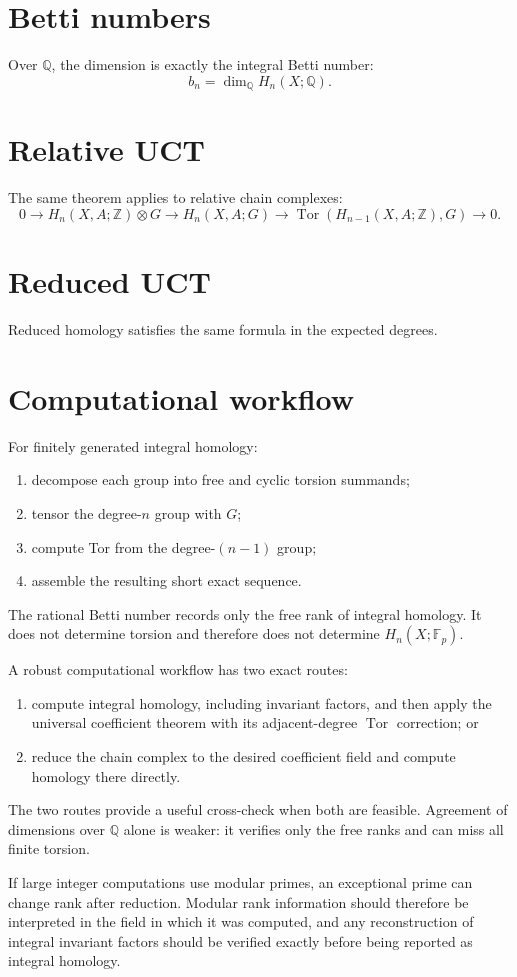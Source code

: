 \section{Betti numbers}
Over \(\mathbb Q\), the dimension is exactly the integral Betti number:
\[
b_n=\dim_{\mathbb Q}H_n(X;\mathbb Q).
\]

\section{Relative UCT}
The same theorem applies to relative chain complexes:
\[
0\to H_n(X,A;\mathbb Z)\otimes G
\to H_n(X,A;G)
\to
\operatorname{Tor}(H_{n-1}(X,A;\mathbb Z),G)
\to0.
\]

\section{Reduced UCT}
Reduced homology satisfies the same formula in the expected degrees.

\section{Computational workflow}
For finitely generated integral homology:
\begin{enumerate}
\item decompose each group into free and cyclic torsion summands;
\item tensor the degree-\(n\) group with \(G\);
\item compute Tor from the degree-\((n-1)\) group;
\item assemble the resulting short exact sequence.
\end{enumerate}

\begin{remark}
The rational Betti number records only the free rank of integral homology.
It does not determine torsion and therefore does not determine
\(H_n(X;\mathbb F_p)\).

A robust computational workflow has two exact routes:

\begin{enumerate}
\item compute integral homology, including invariant factors, and then apply
the universal coefficient theorem with its adjacent-degree
\(\operatorname{Tor}\) correction; or
\item reduce the chain complex to the desired coefficient field and compute
homology there directly.
\end{enumerate}

The two routes provide a useful cross-check when both are feasible.  Agreement
of dimensions over \(\mathbb Q\) alone is weaker: it verifies only the free
ranks and can miss all finite torsion.

If large integer computations use modular primes, an exceptional prime can
change rank after reduction.  Modular rank information should therefore be
interpreted in the field in which it was computed, and any reconstruction of
integral invariant factors should be verified exactly before being reported as
integral homology.
\end{remark}

